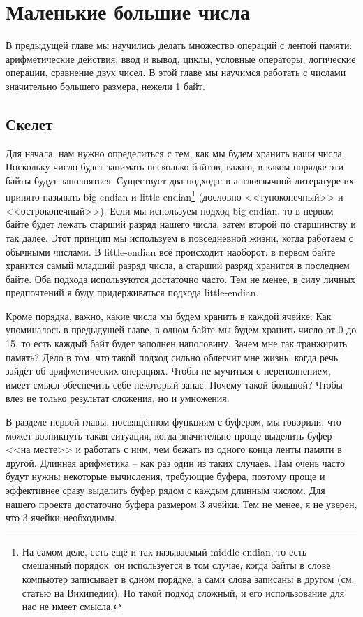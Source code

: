 \documentclass{book}
\begin{document}
\chapter{Маленькие большие числа}
В предыдущей главе мы научились делать множество операций с лентой памяти: арифметические действия, ввод и вывод, циклы, условные
операторы, логические операции, сравнение двух чисел. В этой главе мы научимся работать с числами значительно большего размера,
нежели 1 байт. 

\section{Скелет}

Для начала, нам нужно определиться с тем, как мы будем хранить наши числа. Поскольку число будет занимать несколько байтов, важно,
в каком порядке эти байты будут заполняться. Существует два подхода: в англоязычной литературе их принято называть big-endian и
little-endian\footnote{На самом деле, есть ещё и так называемый middle-endian, то есть смешанный порядок: он используется в том случае,
когда байты в слове компьютер записывает в одном порядке, а сами слова записаны в другом (см. статью на Википедии). Но такой подход
сложный, и его использование для нас не имеет смысла.} (дословно <<тупоконечный>> и <<остроконечный>>). Если мы используем подход
big-endian, то в первом байте будет лежать старший разряд нашего числа, затем второй по старшинству и так далее. Этот принцип мы
используем в повседневной жизни, когда работаем с обычными числами. В little-endian всё происходит наоборот: в первом байте хранится
самый младший разряд числа, а старший разряд хранится в последнем байте. Оба подхода используются достаточно часто. Тем не менее,
в силу личных предпочтений я буду придерживаться подхода little-endian.

Кроме порядка, важно, какие числа мы будем хранить в каждой ячейке. Как упоминалось в предыдущей главе, в одном байте мы будем хранить
число от 0 до 15, то есть каждый байт будет заполнен наполовину. Зачем мне так транжирить память? Дело в том, что такой подход
сильно облегчит мне жизнь, когда речь зайдёт об арифметических операциях. Чтобы не мучиться с переполнением, имеет смысл обеспечить
себе некоторый запас. Почему такой большой? Чтобы влез не только результат сложения, но и умножения.

В разделе первой главы, посвящённом функциям с буфером, мы говорили, что может возникнуть такая ситуация, когда значительно проще
выделить буфер <<на месте>> и работать с ним, чем бежать из одного конца ленты памяти в другой. Длинная арифметика -- как раз один
из таких случаев. Нам очень часто будут нужны некоторые вычисления, требующие буфера, поэтому проще и эффективнее сразу выделить
буфер рядом с каждым длинным числом. Для нашего проекта достаточно буфера размером 3 ячейки. Тем не менее, я не уверен, что
3 ячейки необходимы. 
\end{document}
